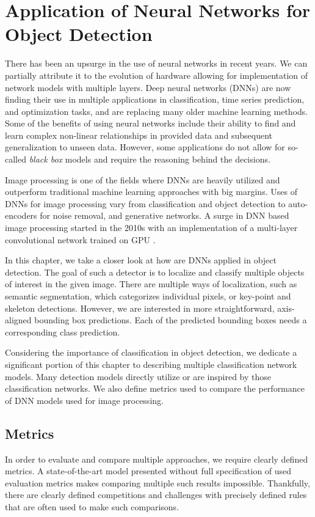 \chapter{Application of Neural Networks for Object Detection}
There has been an upsurge in the use of neural networks in recent years. We can partially attribute it to the evolution of hardware allowing for implementation of network models with multiple layers. Deep neural networks (DNNs) are now finding their use in multiple applications in classification, time series prediction, and optimization tasks, and are replacing many older machine learning methods. Some of the benefits of using neural networks include their ability to find and learn complex non-linear relationships in provided data and subsequent generalization to unseen data. However, some applications do not allow for so-called \textit{black box} models and require the reasoning behind the decisions.

Image processing is one of the fields where DNNs are heavily utilized and outperform traditional machine learning approaches with big margins. Uses of DNNs for image processing vary from classification and object detection to auto-encoders for noise removal, and generative networks. A surge in DNN based image processing started in the 2010s with an implementation of a multi-layer convolutional network trained on GPU \cite{bib:deepOnGpu}. 

In this chapter, we take a closer look at how are DNNs applied in object detection. The goal of such a detector is to localize and classify multiple objects of interest in the given image. There are multiple ways of localization, such as semantic segmentation, which categorizes individual pixels, or key-point and skeleton detections. However, we are interested in more straightforward, axis-aligned bounding box predictions. Each of the predicted bounding boxes needs a corresponding class prediction.

Considering the importance of classification in object detection, we dedicate a significant portion of this chapter to describing multiple classification network models. Many detection models directly utilize or are inspired by those classification networks. We also define metrics used to compare the performance of DNN models used for image processing.

\section{Metrics}
In order to evaluate and compare multiple approaches, we require clearly defined metrics. A state-of-the-art model presented without full specification of used evaluation metrics makes comparing multiple such results impossible. Thankfully, there are clearly defined competitions and challenges with precisely defined rules that are often used to make such comparisons. 


